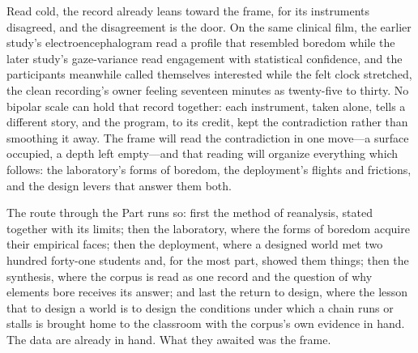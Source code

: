 Read cold, the record already leans toward the frame, for its instruments disagreed, and the disagreement is the door. On the same clinical film, the earlier study's electroencephalogram read a profile that resembled boredom while the later study's gaze-variance read engagement with statistical confidence, and the participants meanwhile called themselves interested while the felt clock stretched, the clean recording's owner feeling seventeen minutes as twenty-five to thirty. No bipolar scale can hold that record together: each instrument, taken alone, tells a different story, and the program, to its credit, kept the contradiction rather than smoothing it away. The frame will read the contradiction in one move---a surface occupied, a depth left empty---and that reading will organize everything which follows: the laboratory's forms of boredom, the deployment's flights and frictions, and the design levers that answer them both.

The route through the Part runs so: first the method of reanalysis, stated together with its limits; then the laboratory, where the forms of boredom acquire their empirical faces; then the deployment, where a designed world met two hundred forty-one students and, for the most part, showed them things; then the synthesis, where the corpus is read as one record and the question of why elements bore receives its answer; and last the return to design, where the lesson that to design a world is to design the conditions under which a chain runs or stalls is brought home to the classroom with the corpus's own evidence in hand. The data are already in hand. What they awaited was the frame.

